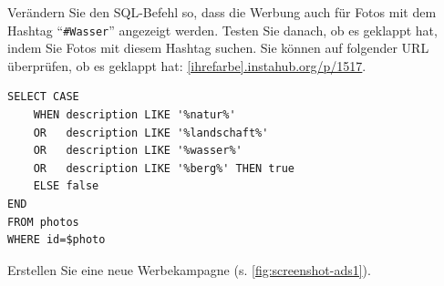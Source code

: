 \begin{myexercise}
  Verändern Sie den SQL-Befehl so, dass die Werbung auch für Fotos mit dem Hashtag ``\texttt{\#Wasser}'' angezeigt werden. Testen Sie danach, ob es geklappt hat, indem Sie Fotos mit diesem Hashtag suchen. Sie können auf folgender URL überprüfen, ob es geklappt hat: \url{[ihrefarbe].instahub.org/p/1517}.
  \begin{myanswer}
    \begin{lstlisting}
SELECT CASE 
	WHEN description LIKE '%natur%' 
	OR   description LIKE '%landschaft%' 
	OR   description LIKE '%wasser%' 
	OR   description LIKE '%berg%' THEN true 
	ELSE false 
END 
FROM photos 
WHERE id=$photo
\end{lstlisting}
  \end{myanswer}
\end{myexercise}

\begin{mychallenge}
  Erstellen Sie eine neue Werbekampagne (s. \cref{fig:screenshot-ads1}).
\end{mychallenge}

